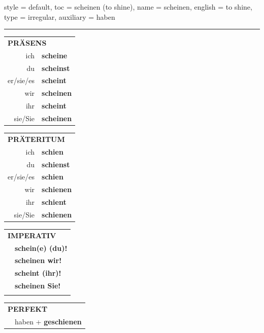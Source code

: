 \begin{verbentry}{
  style = {default},
  toc = {scheinen (to shine)},
  name = {scheinen},
  english = {to shine},
  type = {irregular},
  auxiliary = {haben}
}
 
    
     \vspace{5pt}

    \hrule
    
    \vspace{5pt}

  \begin{tabular}{rl}
     \multicolumn{2}{l}{\textbf{PRÄSENS} }\\
    ich & \textbf{scheine}\\
    du & \textbf{scheinst}\\
    er/sie/es & \textbf{scheint}\\
    wir & \textbf{scheinen}\\
    ihr & \textbf{scheint}\\
    sie/Sie & \textbf{scheinen}\\
  \end{tabular}
  \hfill
     \begin{tabular}{rl}
    \multicolumn{2}{l}{\textbf{PRÄTERITUM} }\\
    ich & \textbf{schien}\\
    du & \textbf{schienst}\\
    er/sie/es & \textbf{schien}\\
    wir & \textbf{schienen}\\
    ihr & \textbf{schient}\\
    sie/Sie & \textbf{schienen}\\
  \end{tabular}
  \hfill
  \begin{tabular}{rl}
     \multicolumn{2}{l}{\textbf{IMPERATIV} }\\
   & \textbf{schein(e) (du)!}\\
   & \textbf{scheinen wir!}\\
   & \textbf{scheint (ihr)!}\\
   & \textbf{scheinen Sie!}\\
   & \vspace{10pt}
  \end{tabular}

    \vspace{10pt}

 \begin{tabular}{rl}
     \multicolumn{2}{l}{\textbf{PERFEKT}}\\
   & haben + \textbf{geschienen}\\
  \end{tabular}
\hfill
   \begin{tabular}{rl}
   

\end{tabular}
\end{verbentry}
